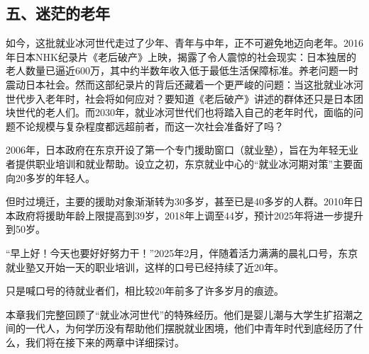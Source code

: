\subsection{五、迷茫的老年}

如今，这批就业冰河世代走过了少年、青年与中年，正不可避免地迈向老年。2016年日本NHK纪录片《老后破产》上映，揭露了令人震惊的社会现实：日本独居的老人数量已逼近600万，其中约半数年收入低于最低生活保障标准。养老问题一时震动日本社会。然而这部纪录片的背后还藏着一个更严峻的问题：当这批就业冰河世代步入老年时，社会将如何应对？要知道《老后破产》讲述的群体还只是日本团块世代的老人们。而2030年，就业冰河世代们也将踏入自己的老年时代，面临的问题不论规模与复杂程度都远超前者，而这一次社会准备好了吗？

2006年，日本政府在东京开设了第一个专门援助窗口（就业塾），旨在为年轻无业者提供职业培训和就业帮助。设立之初，东京就业中心的“就业冰河期对策”主要面向20多岁的年轻人。

但时过境迁，主要的援助对象渐渐转为30多岁，甚至已是40多岁的人群。2010年日本政府将援助年龄上限提高到39岁，2018年上调至44岁，预计2025年将进一步提升到50岁。

“早上好！今天也要好好努力干！”2025年2月，伴随着活力满满的晨礼口号，东京就业塾又开始一天的职业培训，这样的口号已经持续了近20年。

只是喊口号的待就业者们，相比较20年前多了许多岁月的痕迹。

本章我们完整回顾了“就业冰河世代”的特殊经历。他们是婴儿潮与大学生扩招潮之间的一代人，为何学历没有帮助他们摆脱就业困境，他们中青年时代到底经历了什么，我们将在接下来的两章中详细探讨。
